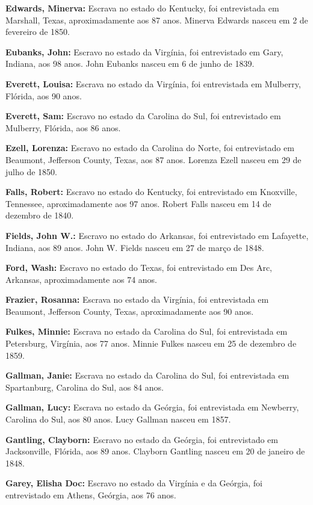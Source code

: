\textbf{Edwards, Minerva:} Escrava no estado do Kentucky, foi
entrevistada em Marshall, Texas, aproximadamente aos 87 anos. Minerva
Edwards nasceu em 2 de fevereiro de 1850.

\textbf{Eubanks, John:} Escravo no estado da Virgínia, foi entrevistado
em Gary, Indiana, aos 98 anos. John Eubanks nasceu em 6 de junho de
1839.

\textbf{Everett, Louisa:} Escrava no estado da Virgínia, foi
entrevistada em Mulberry, Flórida, aos 90 anos.

\textbf{Everett, Sam:} Escravo no estado da Carolina do Sul, foi
entrevistado em Mulberry, Flórida, aos 86 anos.

\textbf{Ezell, Lorenza:} Escravo no estado da Carolina do Norte, foi
entrevistado em Beaumont, Jefferson County, Texas, aos 87 anos. Lorenza
Ezell nasceu em 29 de julho de 1850.

\textbf{Falls, Robert:} Escravo no estado do Kentucky, foi entrevistado
em Knoxville, Tennessee, aproximadamente aos 97 anos. Robert Falls
nasceu em 14 de dezembro de 1840.

\textbf{Fields, John W.:} Escravo no estado do Arkansas, foi
entrevistado em Lafayette, Indiana, aos 89 anos. John W. Fields nasceu
em 27 de março de 1848.

\textbf{Ford, Wash:} Escravo no estado do Texas, foi entrevistado em Des
Arc, Arkansas, aproximadamente aos 74 anos.

\textbf{Frazier, Rosanna:} Escrava no estado da Virgínia, foi
entrevistada em Beaumont, Jefferson County, Texas, aproximadamente aos
90 anos.

\textbf{Fulkes, Minnie:} Escrava no estado da Carolina do Sul, foi
entrevistada em Petersburg, Virgínia, aos 77 anos. Minnie Fulkes nasceu
em 25 de dezembro de 1859.

\textbf{Gallman, Janie:} Escrava no estado da Carolina do Sul, foi
entrevistada em Spartanburg, Carolina do Sul, aos 84 anos.

\textbf{Gallman, Lucy:} Escrava no estado da Geórgia, foi entrevistada
em Newberry, Carolina do Sul, aos 80 anos. Lucy Gallman nasceu em 1857.

\textbf{Gantling, Clayborn:} Escravo no estado da Geórgia, foi
entrevistado em Jacksonville, Flórida, aos 89 anos. Clayborn Gantling
nasceu em 20 de janeiro de 1848.

\textbf{Garey, Elisha Doc:} Escravo no estado da Virgínia e da Geórgia,
foi entrevistado em Athens, Geórgia, aos 76 anos.

